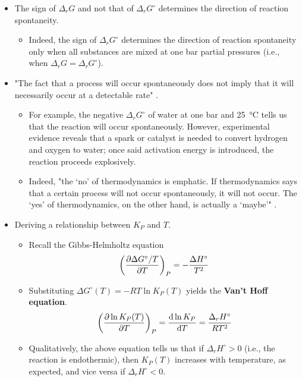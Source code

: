 \documentclass[../notes.tex]{subfiles}
\begin{document}
\begin{itemize}
    \item The sign of $\Delta_rG$ and not that of $\Delta_rG^\circ$ determines the direction of reaction spontaneity.
    \begin{itemize}
        \item Indeed, the sign of $\Delta_rG^\circ$ determines the direction of reaction spontaneity only when all substances are mixed at one bar partial pressures (i.e., when $\Delta_rG=\Delta_rG^\circ$).
    \end{itemize}
    \item "The fact that a process will occur spontaneously does not imply that it will necessarily occur at a detectable rate" \parencite[977]{bib:McQuarrieSimon}.
    \begin{itemize}
        \item For example, the negative $\Delta_rG^\circ$ of water at one bar and \SI{25}{\celsius} tells us that the reaction  will occur spontaneously. However, experimental evidence reveals that a spark or catalyst is needed to convert hydrogen and oxygen to water; once said activation energy is introduced, the reaction proceeds explosively.
        \item Indeed, "the `no' of thermodynamics is emphatic. If thermodynamics says that a certain process will not occur spontaneously, it will not occur. The `yes' of thermodynamics, on the other hand, is actually a `maybe'" \parencite[977]{bib:McQuarrieSimon}.
    \end{itemize}
    \item {}Deriving a relationship between $K_P$ and $T$.
    \begin{itemize}
        \item Recall the Gibbs-Helmholtz equation
        \begin{equation*}
            \left( \pdv{\Delta G^\circ/T}{T} \right)_P = -\frac{\Delta H^\circ}{T^2}
        \end{equation*}
        \item Substituting $\Delta G^\circ(T)=-RT\ln K_P(T)$ yields the \textbf{Van't Hoff equation}.
        \begin{equation*}
            \left( \pdv{\ln K_P(T)}{T} \right)_P = \dv{\ln K_P}{T}
            = \frac{\Delta_rH^\circ}{RT^2}
        \end{equation*}
        \item Qualitatively, the above equation tells us that if $\Delta_rH^\circ>0$ (i.e., the reaction is endothermic), then $K_P(T)$ increases with temperature, as expected, and vice versa if $\Delta_rH^\circ<0$.

\end{itemize}
\end{itemize}
\end{document}
